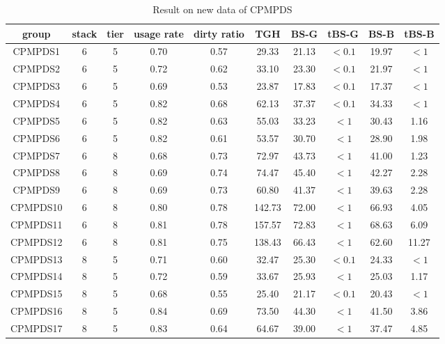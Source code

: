 \documentclass[review,3p,times,authoryear,12pt]{elsarticle}
\begin{document}
\begin{table}[htbp]

\caption{\label{tab:cpmpds} Result on new data of CPMPDS}
\footnotesize
\centering
\begin{tabular}{c|c|c|c|c|c|c|c|c|c}

    \hline
    group & stack & tier  & usage rate & dirty ratio & TGH   & BS-G  & tBS-G & BS-B  & tBS-B \\
    \hline
    CPMPDS1 & 6      & 5     & 0.70  & 0.57  & 29.33   & 21.13  & $<0.1$  & 19.97  & $<1$ \\
    CPMPDS2 & 6      & 5     & 0.72  & 0.62  & 33.10   & 23.30  & $<0.1$  & 21.97  & $<1$ \\
    CPMPDS3 & 6      & 5     & 0.69  & 0.53  & 23.87   & 17.83  & $<0.1$  & 17.37  & $<1$\\
    CPMPDS4 & 6      & 5     & 0.82  & 0.68  & 62.13   & 37.37  & $<0.1$  & 34.33  & $<1$ \\
    CPMPDS5 & 6      & 5     & 0.82  & 0.63  & 55.03   & 33.23  & $<1$    & 30.43  & 1.16  \\
    CPMPDS6 & 6      & 5     & 0.82  & 0.61  & 53.57   & 30.70  & $<1$    & 28.90  & 1.98  \\
    CPMPDS7 & 6      & 8     & 0.68  & 0.73  & 72.97   & 43.73  & $<1$    & 41.00  & 1.23  \\
    CPMPDS8 & 6      & 8     & 0.69  & 0.74  & 74.47   & 45.40  & $<1$    & 42.27  & 2.28  \\
    CPMPDS9 & 6      & 8     & 0.69  & 0.73  & 60.80   & 41.37  & $<1$    & 39.63  & 2.28  \\
    CPMPDS10 & 6     & 8     & 0.80  & 0.78  & 142.73  & 72.00  & $<1$    & 66.93  & 4.05  \\
    CPMPDS11 & 6     & 8     & 0.81  & 0.78  & 157.57  & 72.83  & $<1$    & 68.63  & 6.09  \\
    CPMPDS12 & 6     & 8     & 0.81  & 0.75  & 138.43  & 66.43  & $<1$    & 62.60  & 11.27  \\
    CPMPDS13 & 8     & 5     & 0.71  & 0.60  & 32.47   & 25.30  & $<0.1$  & 24.33  & $<1$ \\
    CPMPDS14 & 8     & 5     & 0.72  & 0.59  & 33.67   & 25.93  & $<1$    & 25.03  & 1.17  \\
    CPMPDS15 & 8     & 5     & 0.68  & 0.55  & 25.40   & 21.17  & $<0.1$  & 20.43  & $<1$ \\
    CPMPDS16 & 8     & 5     & 0.84  & 0.69  & 73.50   & 44.30  & $<1$    & 41.50  & 3.86  \\
    CPMPDS17 & 8     & 5     & 0.83  & 0.64  & 64.67   & 39.00  & $<1$    & 37.47  & 4.85  \\

\end{tabular}
\end{table}
\end{document}
